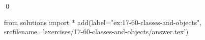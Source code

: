 
\begin{ex}
  \label{ex:17-60-classes-and-objects}
  
  \qed
\end{ex}
\begin{python0}
from solutions import *
add(label="ex:17-60-classes-and-objects",
    srcfilename='exercises/17-60-classes-and-objects/answer.tex')
\end{python0}
